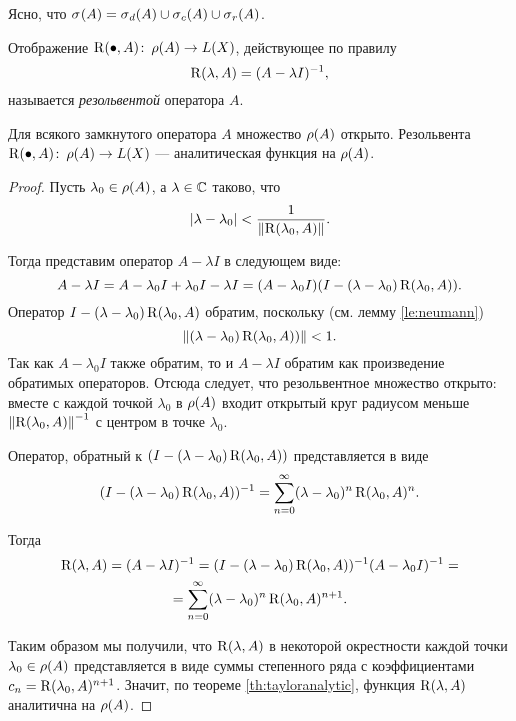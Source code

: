 Ясно, что $\spectrum{A} = \spectrum[d]{A} \cup \spectrum[c]{A} \cup \spectrum[r]{A}$.
\begin{definition}
    Отображение $\operatorname{R}(\bullet, A) \colon \operatorname{\rho}(A) \to L(X)$, действующее по правилу
    \[ \operatorname{R}(\lambda, A) = (A - \lambda I)^{-1}, \]
    называется \emph{резольвентой} оператора $A$.
\end{definition}

\vspace{0.5cm}

\begin{theorem}\label{th:resanalytic}
    Для всякого замкнутого оператора $A$ множество $\operatorname{\rho}(A)$ открыто.
    Резольвента $\operatorname{R}(\bullet, A) \colon \operatorname{\rho}(A) \to L(X)$ --- аналитическая функция
    на $\operatorname{\rho}(A)$.
\end{theorem}

\begin{proof}
    Пусть $\lambda_0 \in \operatorname{\rho}(A)$, а $\lambda \in \mathbb{C}$ таково, что
    \[ \left|\lambda - \lambda_0\right| < \frac{1}{\left\|\operatorname{R}(\lambda_0, A)\right\|}. \]

    Тогда представим оператор $A - \lambda I$ в следующем виде:
    \[ A - \lambda I = A - \lambda_0 I + \lambda_0 I - \lambda I = 
       (A - \lambda_0 I)(I - (\lambda - \lambda_0) \operatorname{R}(\lambda_0, A)). \]
    Оператор $I - (\lambda - \lambda_0) \operatorname{R}(\lambda_0, A)$ обратим, поскольку 
    (см. лемму \ref{le:neumann})
    \[ \left\|(\lambda - \lambda_0) \operatorname{R}(\lambda_0, A))\right\| < 1. \]
    Так как $A - \lambda_0 I$ также обратим, то и $A - \lambda I$ обратим как произведение
    обратимых операторов. Отсюда следует, что резольвентное множество открыто: вместе с каждой
    точкой $\lambda_0$
    в $\operatorname{\rho}(A)$ входит открытый круг радиусом меньше $\left\|\operatorname{R}(\lambda_0, A)\right\|^{-1}$ с 
    центром в точке $\lambda_0$.

    Оператор, обратный к $(I - (\lambda - \lambda_0) \operatorname{R}(\lambda_0, A))$ представляется
    в виде
    \[ (I - (\lambda - \lambda_0) \operatorname{R}(\lambda_0, A))^{-1} = 
        \sum_{n=0}^\infty (\lambda - \lambda_0)^n \operatorname{R}(\lambda_0, A)^n. \]

    Тогда 
    \begin{multline*}
        \operatorname{R}(\lambda, A) = 
            (A - \lambda I)^{-1} = (I - (\lambda - \lambda_0) \operatorname{R}(\lambda_0, A))^{-1}
             (A - \lambda_0 I)^{-1} =\\= \sum_{n=0}^\infty (\lambda - \lambda_0)^n 
             \operatorname{R}(\lambda_0, A)^{n+1}.
    \end{multline*}

    Таким образом мы получили, что $\operatorname{R}(\lambda, A)$ в некоторой окрестности каждой точки
    $\lambda_0 \in \operatorname{\rho}(A)$
    представляется в виде суммы степенного ряда с коэффициентами 
    $c_n = \operatorname{R}(\lambda_0, A)^{n+1}$. Значит, по теореме \ref{th:tayloranalytic},
    функция $\operatorname{R}(\lambda, A)$ аналитична на $\operatorname{\rho}(A)$.
\end{proof}

